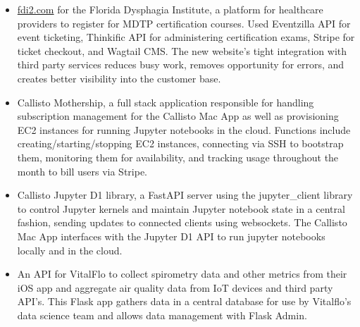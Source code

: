 \begin{cventries}
{\begin{cvitems}
{\begin{itemize}[leftmargin=2ex, nosep, noitemsep]
            \item {\href{https://fdi2.com}{fdi2.com} for the Florida Dysphagia Institute, a platform for healthcare providers to register for MDTP certification courses. Used Eventzilla API for event ticketing, Thinkific API for administering certification exams, Stripe for ticket checkout, and Wagtail CMS. The new website's tight integration with third party services reduces busy work, removes opportunity for errors, and creates better visibility into the customer base.}
            \item {Callisto Mothership, a full stack application responsible for handling subscription management for the Callisto Mac App as well as provisioning EC2 instances for running Jupyter notebooks in the cloud. Functions include creating/starting/stopping EC2 instances, connecting via SSH to bootstrap them, monitoring them for availability, and tracking usage throughout the month to bill users via Stripe.}
            \item {Callisto Jupyter D1 library, a FastAPI server using the jupyter\_client library to control Jupyter kernels and maintain Jupyter notebook state in a central fashion, sending updates to connected clients using websockets. The Callisto Mac App interfaces with the Jupyter D1 API to run jupyter notebooks locally and in the cloud.}
            \item {An API for VitalFlo to collect spirometry data and other metrics from their iOS app and aggregate air quality data from IoT devices and third party API's. This Flask app gathers data in a central database for use by Vitalflo's data science team and allows data management with Flask Admin.}
          \end{itemize}}
      \end{cvitems}
    }


\end{cventries}
